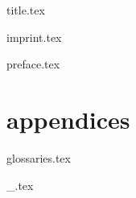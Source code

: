 \documentclass[a4paper,10pt,twocolumn,openany]{book}
\begin{document}
  \frontmatter
  {title.tex}

  \ifauthornotes
    {imprint.tex}
  \fi

  {preface.tex}
  
  \twocolumn
  \mainmatter


  \setcounter{chapter}{0}


  \part{appendices}
  \appendix
    {glossaries.tex}

  \ifauthornotes
    {_.tex}
  \fi
\end{document}
